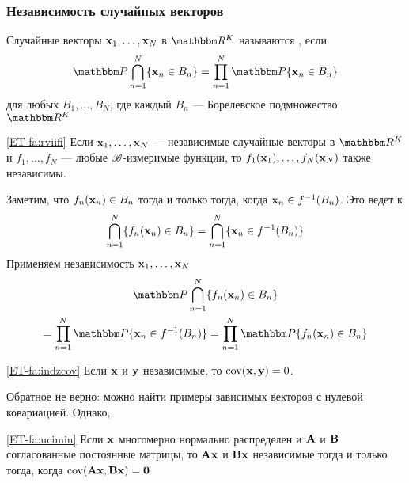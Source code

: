 \begin{frame}\frametitle{Независимость случайных векторов}

    \vspace{2em}
    Случайные векторы ${\mathbf x}_1, \ldots, {\mathbf x}_N$ в $\RR^K$ называются
    , если
    \begin{equation*}
        \label{eq:bcapv}
        \PP \bigcap_{n=1}^N \{\boldx_n \in B_n\}
        = \prod_{n=1}^N \PP\{\boldx_n \in B_n\} 
    \end{equation*}
    для любых $B_1, \ldots, B_N$, где каждый $B_n$ --- Борелевское подмножество $\RR^K$
    
\end{frame}

\begin{frame}
    
    \vspace{2em}
    \Fact\eqref{ET-fa:rviifi}
    Если ${\mathbf x}_1, \ldots, {\mathbf x}_N$ --- независимые случайные векторы в $\RR^K$ и 
    $f_1, \ldots, f_N$ --- любые $\mathscr B$-измеримые функции,
    то $f_1({\mathbf x}_1), \ldots, f_N({\mathbf x}_N)$ также независимы.
    
    \Prf 
    Заметим, что $f_n({\mathbf x}_n) \in B_n$ тогда и только тогда, когда ${\mathbf x}_n \in
    f^{-1}(B_n)$. Это ведет к
    \begin{equation*}
        \bigcap_{n=1}^N \{f_n({\mathbf x}_n) \in B_n\}
        = \bigcap_{n=1}^N \{{\mathbf x}_n \in f^{-1}(B_n)\}
    \end{equation*}
    Применяем независимость ${\mathbf x}_1, \ldots, {\mathbf x}_N$
    \begin{multline*}
        \PP
        \bigcap_{n=1}^N \{f_n(\boldx_n) \in B_n\}
        \\ = \prod_{n=1}^N \PP \{\boldx_n \in f^{-1}(B_n)\}
        = \prod_{n=1}^N \PP \{f_n(\boldx_n) \in B_n\}
    \end{multline*}
    
\end{frame}

\begin{frame}

    \vspace{2em}
    \Fact\eqref{ET-fa:indzcov}
    Если ${\mathbf x}$ и ${\mathbf y}$ независимые, то $\operatorname{cov}({\mathbf x},{\mathbf y}) = 0$.
        
    Обратное не верно: можно найти примеры зависимых векторов с нулевой ковариацией.  
    Однако,

    \Fact\eqref{ET-fa:ucimin}
    Если ${\mathbf x}$ многомерно нормально распределен и $\mathbf A$ и $\mathbf B$ 
    согласованные постоянные матрицы, то $\mathbf A {\mathbf x}$ и
    $\mathbf B {\mathbf x}$ независимые тогда и только тогда, когда $\operatorname{cov}(\mathbf A {\mathbf x}, \mathbf B{\mathbf x}) = {\mathbf 0}$
        
\end{frame}

